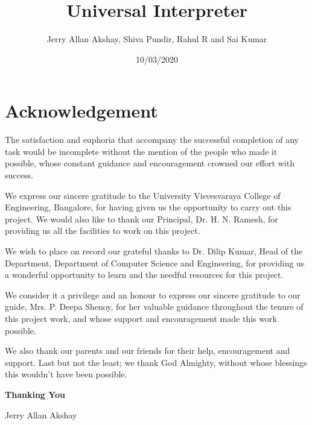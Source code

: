 \documentclass{article}
\title{Universal Interpreter}
\date{10/03/2020}
\author{Jerry Allan Akshay, Shiva Pundir, Rahul R and Sai Kumar}
\begin{document}


 	\maketitle

	\newpage


	\section{Acknowledgement}

		The satisfaction and euphoria that accompany the successful completion of any task would be incomplete without the mention of the people who made it possible, whose constant guidance and encouragement crowned our effort with success. \newline
		 
		We express our sincere gratitude to the University Visvesvaraya College of Engineering, Bangalore, for having given us the opportunity to carry out this project. We would also like to thank our Principal, Dr. H. N. Ramesh, for providing us all the facilities to work on this project. \newline
	 
		We wish to place on record our grateful thanks to Dr. Dilip Kumar, Head of the Department, Department of Computer Science and Engineering, for providing us a wonderful opportunity to learn and the needful resources for this project. \newline 
	 
		We consider it a privilege and an honour to express our sincere gratitude to our guide, Mrs. P. Deepa Shenoy, for her valuable guidance throughout the tenure of this project work, and whose support and encouragement made this work possible.  \newline
	 
		We also thank our parents and our friends for their help, encouragement and support. Last but not the least; we thank God Almighty, without whose blessings this wouldn't have been possible. \newline \newline

		\hfill \textbf{Thanking You} \newline

		\hfill Jerry Allan Akshay 
\end{document}
